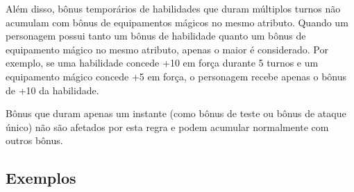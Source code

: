 Além disso, bônus temporários de habilidades que duram múltiplos turnos não acumulam com bônus de equipamentos mágicos no mesmo atributo. Quando um personagem possui tanto um bônus de habilidade quanto um bônus de equipamento mágico no mesmo atributo, apenas o maior é considerado. Por exemplo, se uma habilidade concede +10 em força durante 5 turnos e um equipamento mágico concede +5 em força, o personagem recebe apenas o bônus de +10 da habilidade.

Bônus que duram apenas um instante (como bônus de teste ou bônus de ataque único) não são afetados por esta regra e podem acumular normalmente com outros bônus.

\subsection{Exemplos}

